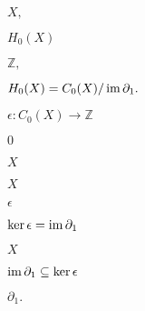 \documentclass[10pt]{book}
\begin{document}
\begin{mdSnippets}
\begin{mdInlineSnippet}[412bd1def2f1b61da9169d88e6c8b9e9]
$X,$\end{mdInlineSnippet}%
\begin{mdInlineSnippet}[8bff2196c2e2709bd987b2ee5a306004]%
$H_0(X)$\end{mdInlineSnippet}%
\begin{mdInlineSnippet}%
$\mathbb{Z},$\end{mdInlineSnippet}%
\begin{mdInlineSnippet}%
$H_0(X) = C_0(X) / \operatorname{im} \partial_1.$\end{mdInlineSnippet}%
\begin{mdInlineSnippet}[205282848fee4fd63738e0f3d54e3922]%
$\epsilon: C_0(X) \to \mathbb{Z}$\end{mdInlineSnippet}%
\begin{mdInlineSnippet}%
$0$\end{mdInlineSnippet}%
\begin{mdInlineSnippet}[02129bb861061d1a052c592e2dc6b383]%
$X$\end{mdInlineSnippet}%
\begin{mdInlineSnippet}[02129bb861061d1a052c592e2dc6b383]%
$X$\end{mdInlineSnippet}%
\begin{mdInlineSnippet}[92e4da341fe8f4cd46192f21b6ff3aa7]%
$\epsilon$\end{mdInlineSnippet}%
\begin{mdInlineSnippet}[9e6d5918836c92dd450eaeb9419c8544]%
$\ker \epsilon = \operatorname{im} \partial_1$\end{mdInlineSnippet}%
\begin{mdInlineSnippet}[02129bb861061d1a052c592e2dc6b383]%
$X$\end{mdInlineSnippet}%
\begin{mdInlineSnippet}[c9bd1c232f8a99321047524c8a350956]%
$\operatorname{im} \partial_1 \subseteq \ker \epsilon$\end{mdInlineSnippet}%
\begin{mdInlineSnippet}[c1c9bb0f9e313628cbf855b66f004ec5]%
$\partial_1.$\end{mdInlineSnippet}%
\begin{mdInlineSnippet}%

\end{mdInlineSnippet}
\end{mdSnippets}
\end{document}
